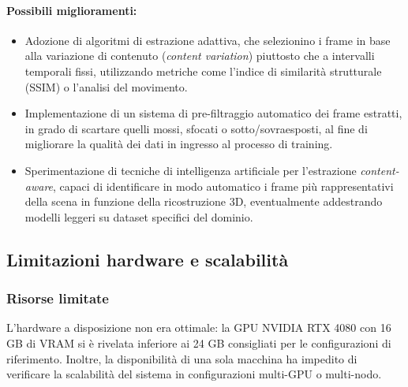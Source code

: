 \paragraph{Possibili miglioramenti:}
\begin{itemize}
	\item Adozione di algoritmi di estrazione adattiva, che selezionino i frame in base alla variazione di contenuto (\emph{content variation}) piuttosto che a intervalli temporali fissi, utilizzando metriche come l'indice di similarità strutturale (SSIM) o l'analisi del movimento.
	\item Implementazione di un sistema di pre-filtraggio automatico dei frame estratti, in grado di scartare quelli mossi, sfocati o sotto/sovraesposti, al fine di migliorare la qualità dei dati in ingresso al processo di training.
	\item Sperimentazione di tecniche di intelligenza artificiale per l'estrazione \emph{content-aware}, capaci di identificare in modo automatico i frame più rappresentativi della scena in funzione della ricostruzione 3D, eventualmente addestrando modelli leggeri su dataset specifici del dominio.
\end{itemize}

\subsection{Limitazioni hardware e scalabilità}
\subsubsection{Risorse limitate}
L'hardware a disposizione non era ottimale: la GPU NVIDIA RTX 4080 con 16 GB di VRAM si è rivelata inferiore ai 24 GB consigliati per le configurazioni di riferimento.  
Inoltre, la disponibilità di una sola macchina ha impedito di verificare la scalabilità del sistema in configurazioni multi-GPU o multi-nodo.


